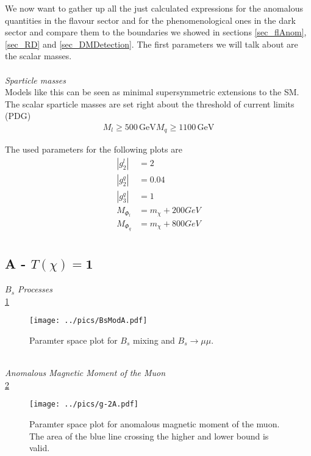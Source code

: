 We now want to gather up all the just calculated expressions for the anomalous quantities in the flavour sector and for the phenomenological ones 
in the dark sector and compare them to the boundaries we showed in sections \ref{sec_flAnom}, \ref{sec_RD} and \ref{sec_DMDetection}. The first
parameters we will talk about are the scalar masses.
\\ \\ \textit{Sparticle masses}\\
Models like this can be seen as minimal supersymmetric extensions to the SM.
The scalar sparticle masses are set right about the threshold of current limits (PDG)
\begin{align}
 M_l \geq 500 \, \text{GeV}
 M_q \geq 1100 \, \text{GeV}
\end{align}



The used parameters for the following plots are
\begin{align}
 |g^l_2| &= 2\\
 |g^q_2| &= 0.04\\
 |g^q_3| &= 1\\
 M_{\Phi_l} &= m_\chi + 200 GeV\\
 M_{\Phi_q} &= m_\chi + 800 GeV\\
 \label{eq_resParams}
\end{align}

\subsection{A - $T(\chi)=\boldsymbol{1}$}
\textit{$B_s$ Processes}\\
\noindent \ref{pic_BsResA}
\begin{figure}[t]
 \texttt{[image: ../pics/BsModA.pdf]}
 \caption{Paramter space plot for $B_s$ mixing and $B_s\rightarrow \mu\mu$.}
 \label{pic_BsResA}
\end{figure}
\\ \textit{Anomalous Magnetic Moment of the Muon}\\
\noindent \ref{pic_g-2A}
\begin{figure}[t]
 \texttt{[image: ../pics/g-2A.pdf]}
 \caption{Paramter space plot for anomalous magnetic moment of the muon. The area of the blue line crossing the higher and lower bound is valid.}
 \label{pic_g-2A}
\end{figure}

